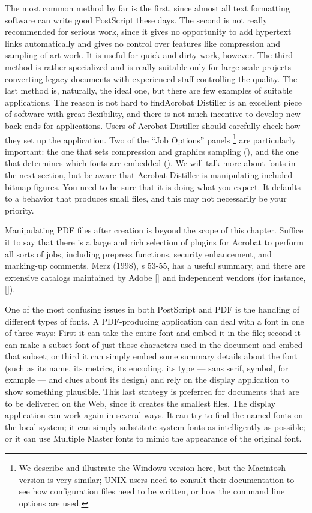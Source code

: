 The most common method by far is the first, since almost all text
formatting software can write good PostScript these days. The second is
not really recommended for serious work, since it gives no opportunity
to add hypertext links automatically and gives no control over features
like compression and sampling of art work. It is useful for quick and
dirty work, however. The third method is rather specialized and is
really suitable only for large-scale projects converting legacy
documents with experienced staff controlling the quality. The last
method is, naturally, the ideal one, but there are few examples of
suitable applications. The reason is not hard to findAcrobat Distiller
is an excellent piece of software with great flexibility, and there is
not much incentive to develop new back-ends for applications. 
Users of Acrobat Distiller should carefully check how they set up the
application. Two of the ``Job Options'' panels \footnote{
We describe
and illustrate the Windows version here, but the Macintosh version is
very similar; UNIX users need to consult their documentation to see how
configuration files need to be written, or how the command line options
are used. 
} are particularly important: the one that sets compression and graphics
sampling (), and the one that determines which fonts are
embedded (). We will talk more about fonts in the next 
section, but be aware that Acrobat Distiller is manipulating included
bitmap figures. You need to be sure that it is doing what you expect. It
defaults to a behavior that produces small files, and this may not
necessarily be your priority. 

Manipulating PDF files after creation is beyond the scope of this
chapter. Suffice it to say that there is a large and rich selection of
plugins for Acrobat to perform all sorts of jobs, including prepress
functions, security enhancement, and marking-up comments. Merz (1998),
s 53-55, has a useful summary, and there are extensive catalogs
maintained by Adobe [] and independent vendors (for instance, []). 


One of the most confusing issues in both PostScript and PDF is the
handling of different types of fonts. A PDF-producing application can
deal with a font in one of three ways: First it can take the entire font
and embed it in the file; second it can make a subset font of just those
characters used in the document and embed that subset; or third it can
simply embed some summary details about the font (such as its name, its
metrics, its encoding, its type --- sans serif, symbol, for example --- and clues
about its design) and rely on the display application to show something
plausible. This last strategy is preferred for documents that are to be
delivered on the Web, since it creates the smallest files. The display
application can work again in several ways. It can try to find the named
fonts on the local system; it can simply substitute system fonts as
intelligently as possible; or it can use Multiple Master fonts to mimic
the appearance of the original font. 
 
